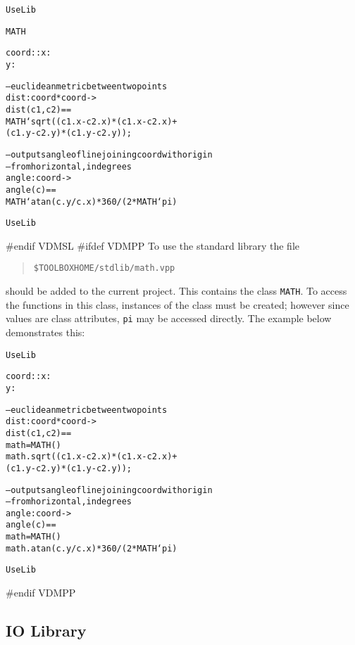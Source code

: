 \documentclass[\pformat,12pt]{article}
\begin{document}
\begin{alltt}
 UseLib

     MATH 



  coord :: x : 
           y : 


  -- euclidean metric between two points
  dist : coord * coord -> 
  dist (c1,c2) ==
    MATH`sqrt((c1.x - c2.x) * (c1.x - c2.x) +
              (c1.y - c2.y) * (c1.y - c2.y));


  -- outputs angle of line joining coord with origin
  -- from horizontal, in degrees
  angle : coord -> 
  angle (c) ==
    MATH`atan (c.y / c.x) * 360 / ( 2 * MATH`pi)

 UseLib
\end{alltt}

#endif VDMSL
#ifdef VDMPP
To use the standard library the file 
\begin{quote}
\verb+$TOOLBOXHOME/stdlib/math.vpp+
\end{quote}
should be added to the
current project. This contains the class \texttt{MATH}. To access the
functions in this class, instances of the class must be
created; however since values are class attributes, \texttt{pi} may be
accessed directly. The example below demonstrates this:
\begin{alltt}
 UseLib


  coord :: x : 
           y : 


  -- euclidean metric between two points
  dist : coord * coord -> 
  dist (c1,c2) ==
     math =  MATH()
    math.sqrt((c1.x - c2.x) * (c1.x - c2.x) +
              (c1.y - c2.y) * (c1.y - c2.y));

  -- outputs angle of line joining coord with origin
  -- from horizontal, in degrees
  angle : coord -> 
  angle (c) ==
     math =  MATH()
    math.atan (c.y / c.x) * 360 / ( 2 * MATH`pi)

 UseLib
\end{alltt}
#endif VDMPP

\subsection{IO Library}
\end{document}
